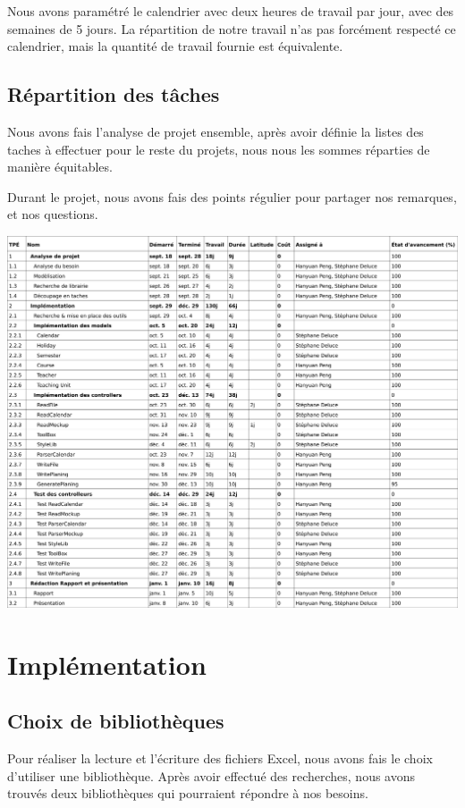 \documentclass{polytech/polytech}
\begin{document}
	Nous avons paramétré le calendrier avec deux heures de travail par jour, avec des semaines de 5 jours.
	La répartition de notre travail n'as pas forcément respecté ce calendrier, mais la quantité de travail fournie est équivalente.

	\section{Répartition des tâches}
	
	Nous avons fais l'analyse de projet ensemble, après avoir définie la listes des taches à effectuer pour le reste du projets, nous nous les sommes réparties de manière équitables.
	
	Durant le projet, nous avons fais des points régulier pour partager nos remarques, et nos questions.
	
	\includegraphics[width=\textwidth]{./img/taches-list.png}

	\chapter{Implémentation}

	\section{Choix de bibliothèques}

	Pour réaliser la lecture et l'écriture des fichiers Excel, nous avons fais le choix d'utiliser une bibliothèque.
	Après avoir effectué des recherches, nous avons trouvés deux bibliothèques qui pourraient répondre à nos besoins.
\end{document}
